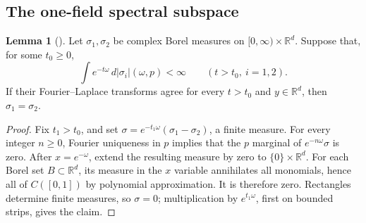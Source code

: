 \documentclass[11pt,letterpaper,reqno]{amsart}
\theoremstyle{definition}
\newtheorem{qcmlemma}[qcmproposition]{Lemma}
\newenvironment{lemma}[1][]{\pushQED{\qed}\renewcommand{\qedsymbol}{$\blacksquare$}\begin{qcmlemma}[#1]}{\popQED\end{qcmlemma}}
\begin{document}
\subsection{The one-field spectral subspace}
\begin{lemma}\label{qcm:laplace-fourier-amplitude}
Let $\sigma_1,\sigma_2$ be complex Borel measures on
$[0,\infty)\times\mathbb R^d$. Suppose that, for some $t_0\ge0$,
\[
 \int e^{-t\omega}\,d|\sigma_i|(\omega,p)<\infty
 \qquad(t>t_0,\ i=1,2).
\]
If their Fourier--Laplace transforms agree for every $t>t_0$
and $y\in\mathbb R^d$, then $\sigma_1=\sigma_2$.
\end{lemma}
\begin{proof}
Fix $t_1>t_0$, and set
$\sigma=e^{-t_1\omega}(\sigma_1-\sigma_2)$, a finite measure.
For every integer $n\ge0$, Fourier uniqueness in $p$ implies
that the $p$ marginal of $e^{-n\omega}\sigma$ is zero.
After $x=e^{-\omega}$, extend the resulting measure by zero to
$\{0\}\times\mathbb R^d$.
For each Borel set $B\subset\mathbb R^d$, its measure in the
$x$ variable annihilates all monomials, hence all of $C([0,1])$
by polynomial approximation. It is therefore zero.
Rectangles determine finite measures, so $\sigma=0$; multiplication
by $e^{t_1\omega}$, first on bounded strips, gives the claim.
\end{proof}
\end{document}
